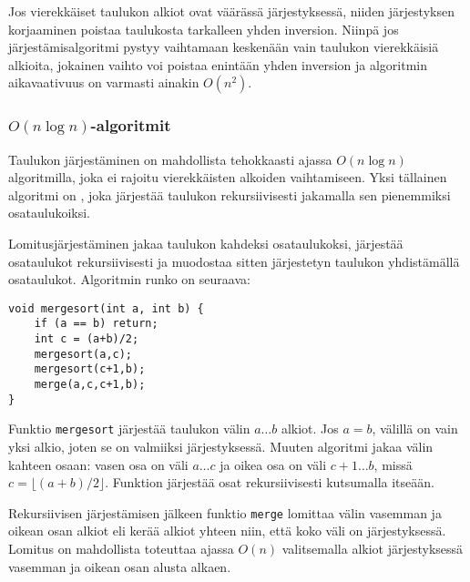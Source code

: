 Jos vierekkäiset taulukon alkiot
ovat väärässä järjestyksessä,
niiden järjestyksen korjaaminen
poistaa taulukosta tarkalleen yhden inversion.
Niinpä jos järjestämisalgoritmi pystyy
vaihtamaan keskenään vain
taulukon vierekkäisiä alkioita,
jokainen vaihto voi poistaa enintään yhden inversion
ja algoritmin aikavaativuus on varmasti ainakin $O(n^2)$.

\subsubsection{$O(n \log n)$-algoritmit}


Taulukon järjestäminen on mahdollista
tehokkaasti ajassa $O(n \log n)$
algoritmilla, joka ei rajoitu vierekkäisten
alkoiden vaihtamiseen.
Yksi tällainen algoritmi on
,
joka järjestää taulukon
rekursiivisesti jakamalla sen
pienemmiksi osataulukoiksi.

Lomitusjärjestäminen
jakaa taulukon kahdeksi osataulukoksi,
järjestää osataulukot rekursiivisesti ja muodostaa
sitten järjestetyn taulukon yhdistämällä osataulukot.
Algoritmin runko on seuraava:

\begin{lstlisting}
void mergesort(int a, int b) {
    if (a == b) return;
    int c = (a+b)/2;
    mergesort(a,c);
    mergesort(c+1,b);
    merge(a,c,c+1,b);
}
\end{lstlisting}

Funktio \texttt{mergesort}
järjestää taulukon välin $a \ldots b$ alkiot.
Jos $a=b$, välillä on vain yksi alkio,
joten se on valmiiksi järjestyksessä.
Muuten algoritmi jakaa välin
kahteen osaan: vasen osa on väli $a \ldots c$
ja oikea osa on väli $c+1 \ldots b$, missä $c=\lfloor (a+b)/2 \rfloor$.
Funktion järjestää osat rekursiivisesti
kutsumalla itseään.

Rekursiivisen järjestämisen jälkeen funktio \texttt{merge}
lomittaa välin vasemman ja oikean osan alkiot
eli kerää alkiot yhteen niin,
että koko väli on järjestyksessä.
Lomitus on mahdollista toteuttaa ajassa $O(n)$
valitsemalla alkiot järjestyksessä vasemman ja
oikean osan alusta alkaen.

